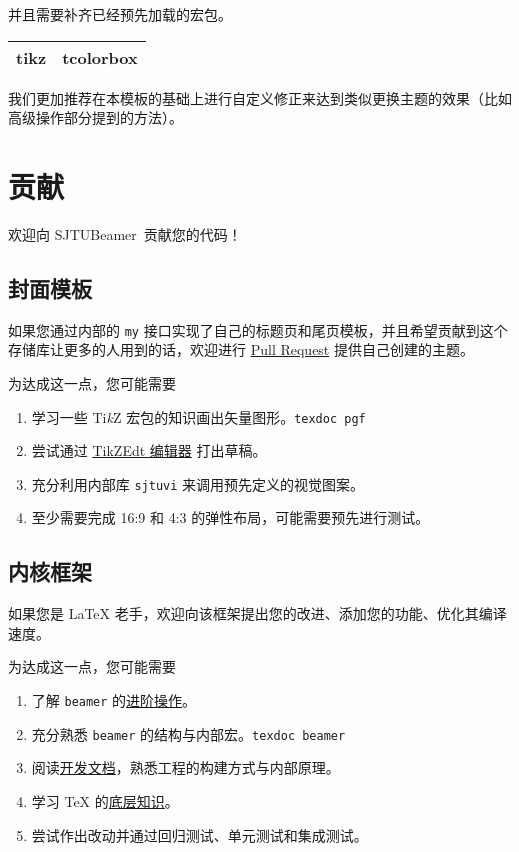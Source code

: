 \documentclass[
    UTF8,
    heading=true,
    12pt,
    a4paper
]{ctexrep}
\def\themename{\textsf{SJTUBeamer}}
\begin{document}
    并且需要补齐已经预先加载的宏包。

    \begin{table}[h]
        \centering
        \begin{tabular}{>{\sffamily}c>{\sffamily}c}
            \hline
            tikz & tcolorbox \\
            \hline
        \end{tabular}
    \end{table}

    我们更加推荐在本模板的基础上进行自定义修正来达到类似更换主题的效果（比如高级操作部分提到的方法）。


    \chapter{贡献}

    欢迎向 \themename\ 贡献您的代码！

    \section{封面模板}

    如果您通过内部的 \texttt{my} 接口实现了自己的标题页和尾页模板，并且希望贡献到这个存储库让更多的人用到的话，欢迎进行 \href{https://github.com/sjtug/SJTUBeamer/pulls}{Pull Request} 提供自己创建的主题。

    为达成这一点，您可能需要
    \begin{enumerate}
        \item 学习一些 Ti\textit{k}Z 宏包的知识画出矢量图形。\texttt{texdoc pgf}
        \item 尝试通过 \href{https://code.google.com/archive/p/tikzedt/downloads}{TikZEdt 编辑器} 打出草稿。
        \item 充分利用内部库 \texttt{sjtuvi} 来调用预先定义的视觉图案。
        \item 至少需要完成 16:9 和 4:3 的弹性布局，可能需要预先进行测试。
    \end{enumerate}
   
    \section{内核框架}

    如果您是 \LaTeX{} 老手，欢迎向该框架提出您的改进、添加您的功能、优化其编译速度。

    为达成这一点，您可能需要
    \begin{enumerate}
        \item 了解 \texttt{beamer} 的\href{https://latex-beamer.com/}{进阶操作}。
        \item 充分熟悉 \texttt{beamer} 的结构与内部宏。\texttt{texdoc beamer}
        \item 阅读\href{run:sjtubeamerdevguide.pdf}{开发文档}，熟悉工程的构建方式与内部原理。
        \item 学习 \TeX{} 的\href{https://mirrors.sjtug.sjtu.edu.cn/CTAN/graphics/pgf/contrib/pgfplots/doc/TeX-programming-notes.pdf}{底层知识}。
        \item 尝试作出改动并通过回归测试、单元测试和集成测试。
    \end{enumerate}
\end{document}
